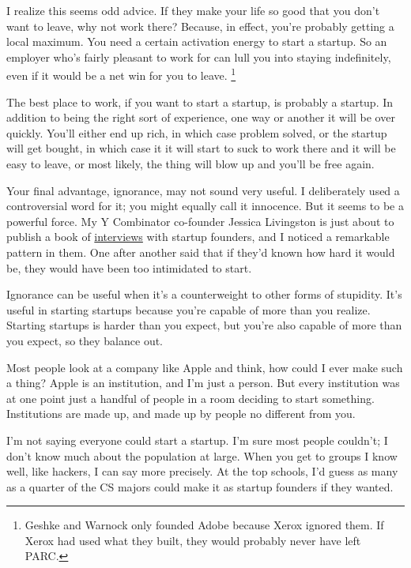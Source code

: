 I realize this seems odd advice. If they make your life so good that you
don't want to leave, why not work there? Because, in effect, you're
probably getting a local maximum. You need a certain activation energy
to start a startup. So an employer who's fairly pleasant to work for can
lull you into staying indefinitely, even if it would be a net win for
you to leave. \footnote{Geshke and Warnock only founded Adobe because Xerox ignored
them. If Xerox had used what they built, they would probably never have
left PARC.}

The best place to work, if you want to start a startup, is probably a
startup. In addition to being the right sort of experience, one way or
another it will be over quickly. You'll either end up rich, in which
case problem solved, or the startup will get bought, in which case it it
will start to suck to work there and it will be easy to leave, or most
likely, the thing will blow up and you'll be free again.

Your final advantage, ignorance, may not sound very useful. I
deliberately used a controversial word for it; you might equally call it
innocence. But it seems to be a powerful force. My Y Combinator
co-founder Jessica Livingston is just about to publish a book of
\href{http://www.amazon.com/gp/product/1590597141}{interviews} with
startup founders, and I noticed a remarkable pattern in them. One after
another said that if they'd known how hard it would be, they would have
been too intimidated to start.

Ignorance can be useful when it's a counterweight to other forms of
stupidity. It's useful in starting startups because you're capable of
more than you realize. Starting startups is harder than you expect, but
you're also capable of more than you expect, so they balance out.

Most people look at a company like Apple and think, how could I ever
make such a thing? Apple is an institution, and I'm just a person. But
every institution was at one point just a handful of people in a room
deciding to start something. Institutions are made up, and made up by
people no different from you.

I'm not saying everyone could start a startup. I'm sure most people
couldn't; I don't know much about the population at large. When you get
to groups I know well, like hackers, I can say more precisely. At the
top schools, I'd guess as many as a quarter of the CS majors could make
it as startup founders if they wanted.

